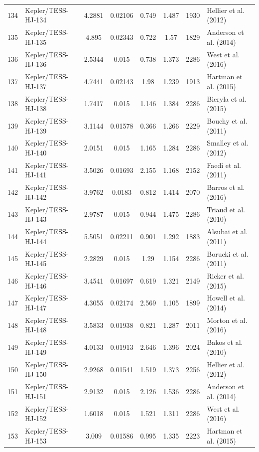 \begin{longtable}{r l c c c c c p{4.2cm}}
134 & Kepler/TESS-HJ-134 & 4.2881 & 0.02106 & 0.749 & 1.487 & 1930 & Hellier et al. (2012) \\
135 & Kepler/TESS-HJ-135 & 4.895 & 0.02343 & 0.722 & 1.57 & 1829 & Anderson et al. (2014) \\
136 & Kepler/TESS-HJ-136 & 2.5344 & 0.015 & 0.738 & 1.373 & 2286 & West et al. (2016) \\
137 & Kepler/TESS-HJ-137 & 4.7441 & 0.02143 & 1.98 & 1.239 & 1913 & Hartman et al. (2015) \\
138 & Kepler/TESS-HJ-138 & 1.7417 & 0.015 & 1.146 & 1.384 & 2286 & Bieryla et al. (2015) \\
139 & Kepler/TESS-HJ-139 & 3.1144 & 0.01578 & 0.366 & 1.266 & 2229 & Bouchy et al. (2011) \\
140 & Kepler/TESS-HJ-140 & 2.0151 & 0.015 & 1.165 & 1.284 & 2286 & Smalley et al. (2012) \\
141 & Kepler/TESS-HJ-141 & 3.5026 & 0.01693 & 2.155 & 1.168 & 2152 & Faedi et al. (2011) \\
142 & Kepler/TESS-HJ-142 & 3.9762 & 0.0183 & 0.812 & 1.414 & 2070 & Barros et al. (2016) \\
143 & Kepler/TESS-HJ-143 & 2.9787 & 0.015 & 0.944 & 1.475 & 2286 & Triaud et al. (2010) \\
144 & Kepler/TESS-HJ-144 & 5.5051 & 0.02211 & 0.901 & 1.292 & 1883 & Alsubai et al. (2011) \\
145 & Kepler/TESS-HJ-145 & 2.2829 & 0.015 & 1.29 & 1.154 & 2286 & Borucki et al. (2011) \\
146 & Kepler/TESS-HJ-146 & 3.4541 & 0.01697 & 0.619 & 1.321 & 2149 & Ricker et al. (2015) \\
147 & Kepler/TESS-HJ-147 & 4.3055 & 0.02174 & 2.569 & 1.105 & 1899 & Howell et al. (2014) \\
148 & Kepler/TESS-HJ-148 & 3.5833 & 0.01938 & 0.821 & 1.287 & 2011 & Morton et al. (2016) \\
149 & Kepler/TESS-HJ-149 & 4.0133 & 0.01913 & 2.646 & 1.396 & 2024 & Bakos et al. (2010) \\
150 & Kepler/TESS-HJ-150 & 2.9268 & 0.01541 & 1.519 & 1.373 & 2256 & Hellier et al. (2012) \\
151 & Kepler/TESS-HJ-151 & 2.9132 & 0.015 & 2.126 & 1.536 & 2286 & Anderson et al. (2014) \\
152 & Kepler/TESS-HJ-152 & 1.6018 & 0.015 & 1.521 & 1.311 & 2286 & West et al. (2016) \\
153 & Kepler/TESS-HJ-153 & 3.009 & 0.01586 & 0.995 & 1.335 & 2223 & Hartman et al. (2015) \\

\end{longtable}
